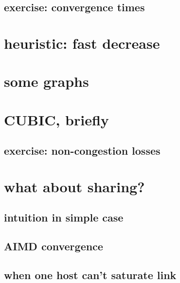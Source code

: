 \subsection{exercise: convergence times}


\section{heuristic: fast decrease}



\section{some graphs}


\section{CUBIC, briefly}


\subsection{exercise: non-congestion losses}



\section{what about sharing?}


\subsection{intuition in simple case}


\subsection{AIMD convergence}


\subsection{when one host can't saturate link}


